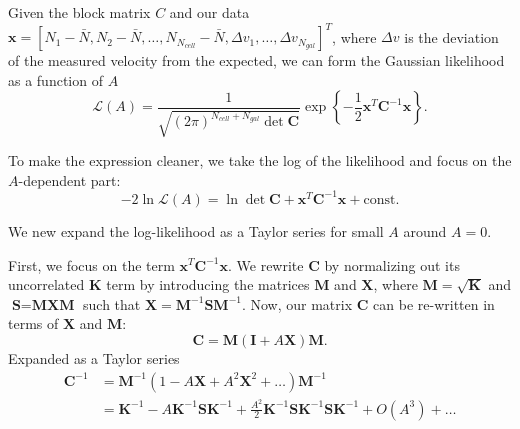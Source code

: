 \documentclass{article}
\begin{document}
Given the block matrix $C$ and our data $\textbf{x}= [N_1-\bar{N}, N_2-\bar{N}, \hdots, N_{N_{cell}}-\bar{N}, \Delta v_1, \hdots, \Delta v_{N_{gal}}]^T$, where $\Delta v$ is the deviation of the measured velocity from the expected, we can form the Gaussian likelihood as a function of $A$
\[
\mathcal{L}(A) = \frac{1}{\sqrt{\left(2\pi\right)^{N_{cell}+N_{gal}} \det \textbf{C}}}\exp\left\{-\frac{1}{2}\textbf{x}^T\textbf{C}^{-1}\textbf{x}\right\}.
\]\par
To make the expression cleaner, we take the log of the likelihood and focus on the $A$-dependent part:
\begin{equation}
-2\ln\mathcal{L}(A) = \ln\det\textbf{C} + \textbf{x}^T\textbf{C}^{-1}\textbf{x} + \text{const}.
\label{log:eqn}
\end{equation}\par


We new expand the log-likelihood as a Taylor series for small $A$ around $A=0$.

First, we focus on the  term $\textbf{x}^T\textbf{C}^{-1}\textbf{x}$. We rewrite $\textbf{C}$ by normalizing out its uncorrelated $\textbf{K}$ term
by   introducing the matrices $\textbf{M}$ and $\textbf{X}$,
where $\textbf{M}=\sqrt{\textbf{K}}$ and $\textbf{S} = \textbf{M} \textbf{X} \textbf{M}$ such that $\textbf{X}=\textbf{M}^{-1}\textbf{S}\textbf{M}^{-1}$. Now, our matrix $\textbf{C}$ can be re-written in terms of $\textbf{X}$ and $\textbf{M}$:
\begin{equation}
\textbf{C} = \textbf{M}(\textbf{I}+A\textbf{X})\textbf{M}.
\end{equation}
Expanded as a Taylor series
\begin{align}
\textbf{C}^{-1} & = \textbf{M}^{-1}(1-A\textbf{X}+A^2 \textbf{X}^2 + \ldots) \textbf{M}^{-1} \\
& = \textbf{K}^{-1}   -A \textbf{K}^{-1}\textbf{S}\textbf{K}^{-1} +\frac{A^2}{2} \textbf{K}^{-1}\textbf{S}\textbf{K}^{-1}\textbf{S}\textbf{K}^{-1} +O(A^3) + \ldots 
\end{align}
\end{document}
